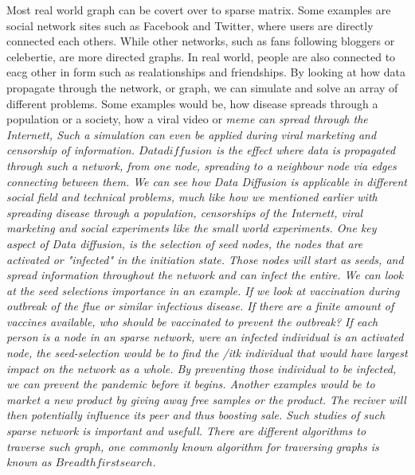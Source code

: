 Most real world graph can be covert over to sparse matrix. Some examples are social network sites such as Facebook and Twitter, where users are directly connected each others. While other networks, such as fans following bloggers or celebertie, are more directed graphs. In real world, people are also connected to eacg other in form such as realationships and friendships. By looking at how data propagate through the network, or graph, we can simulate and solve an array of different problems. Some examples would be, how disease spreads through a population or a society, how a viral video or \it{meme} can spread through the Internett, Such a simulation can even be applied during viral marketing and censorship of information. $Data diffusion$ is the effect where data is propagated through such a network, from one node, spreading to a neighbour node via edges connecting between them. We can see how Data Diffusion is applicable in different social field and technical problems, much like how we mentioned earlier with spreading disease through a population, censorships of the Internett, viral marketing and social experiments like the small world experiments. One key aspect of Data diffusion, is the selection of seed nodes, the nodes that are activated or "infected" in the initiation state. Those nodes will start as seeds, and spread information throughout the network and can infect the entire. We can look at the seed selections importance in an example. If we look at vaccination during outbreak of the flue or similar infectious disease. If there are a finite amount of vaccines available, who should be vaccinated to prevent the outbreak? If each person is a node in an sparse network, were an infected individual is an activated node, the seed-selection would be to find the /it{k} individual that would have largest impact on the network as a whole. By preventing those individual to be infected, we can prevent the pandemic before it begins. Another examples would be to market a new product by giving away free samples or the product. The reciver will then potentially influence its peer and thus boosting sale. Such studies of such sparse network is important and usefull. There are different algorithms to traverse such graph, one commonly known algorithm for traversing graphs is known as $Breadth first search$. 


